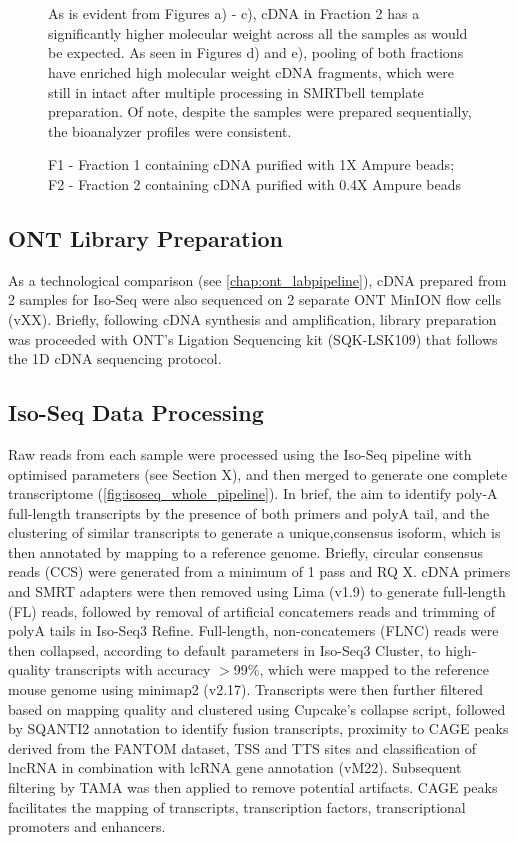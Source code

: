 \begin{figure}[!htp]
{	\\
	\\	 	
	As is evident from Figures a) - c), cDNA in Fraction 2 has a significantly higher molecular weight across all the samples as would be expected. As seen in Figures d) and e), pooling of both fractions have enriched high molecular weight cDNA fragments, which were still in intact after multiple processing in SMRTbell template preparation. Of note, despite the samples were prepared sequentially, the bioanalyzer profiles were consistent. 
	
	F1 - Fraction 1 containing cDNA purified with 1X Ampure beads; F2 - Fraction 2 containing cDNA purified with 0.4X Ampure beads
 }
	\label{fig:isoseq_whole_bioresults}
\end{figure}

\subsection{ONT Library Preparation}
As a technological comparison (see \cref{chap:ont_labpipeline}), cDNA prepared from 2 samples for Iso-Seq were also sequenced on 2 separate ONT MinION flow cells (vXX). Briefly, following cDNA synthesis and amplification, library preparation was proceeded with ONT's Ligation Sequencing kit (SQK-LSK109) that follows the 1D cDNA sequencing protocol. 


\subsection{Iso-Seq Data Processing}
Raw reads from each sample were processed using the Iso-Seq pipeline with optimised parameters (see Section X), and then merged to generate one complete transcriptome (\cref{fig:isoseq_whole_pipeline}). In brief, the aim to identify poly-A full-length transcripts by the presence of both primers and polyA tail, and the clustering of similar transcripts to generate a unique,consensus isoform, which is then annotated by mapping to a reference genome. Briefly, circular consensus reads (CCS) were generated from a minimum of 1 pass and RQ X. cDNA primers and SMRT adapters were then removed using Lima (v1.9) to generate full-length (FL) reads, followed by removal of artificial concatemers reads and trimming of polyA tails in Iso-Seq3 Refine. Full-length, non-concatemers (FLNC) reads were then collapsed, according to default parameters in Iso-Seq3 Cluster, to high-quality transcripts with accuracy $>$99\%, which were mapped to the reference mouse genome using minimap2 (v2.17). Transcripts were then further filtered based on mapping quality and clustered using Cupcake's collapse script, followed by SQANTI2 annotation to identify fusion transcripts, proximity to CAGE peaks derived from the FANTOM dataset, TSS and TTS sites and classification of lncRNA in combination with lcRNA gene annotation (vM22).  Subsequent filtering by TAMA was then applied to remove potential artifacts. CAGE peaks facilitates the mapping of transcripts, transcription factors, transcriptional promoters and enhancers.

